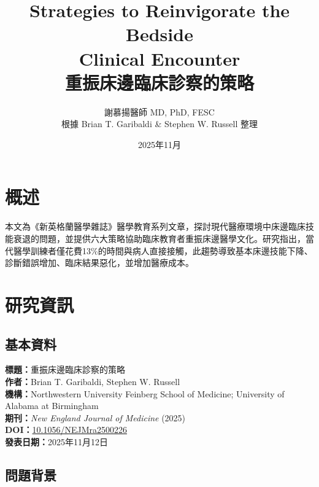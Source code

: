 \documentclass[11pt,a4paper]{article}
\title{\textbf{\Large Strategies to Reinvigorate the Bedside\\
Clinical Encounter\\
重振床邊臨床診察的策略}}
\author{謝慕揚醫師 MD, PhD, FESC\\
根據 Brian T. Garibaldi \& Stephen W. Russell 整理}
\date{2025年11月}
\begin{document}
\maketitle

\section{概述}

本文為《新英格蘭醫學雜誌》醫學教育系列文章，探討現代醫療環境中床邊臨床技能衰退的問題，並提供六大策略協助臨床教育者重振床邊醫學文化。研究指出，當代醫學訓練者僅花費13\%的時間與病人直接接觸，此趨勢導致基本床邊技能下降、診斷錯誤增加、臨床結果惡化，並增加醫療成本。

\section{研究資訊}

\subsection{基本資料}
\textbf{標題：}重振床邊臨床診察的策略\\
\textbf{作者：}Brian T. Garibaldi, Stephen W. Russell\\
\textbf{機構：}Northwestern University Feinberg School of Medicine; University of Alabama at Birmingham\\
\textbf{期刊：}\textit{New England Journal of Medicine} (2025)\\
\textbf{DOI：}\href{https://doi.org/10.1056/NEJMra2500226}{10.1056/NEJMra2500226}\\
\textbf{發表日期：}2025年11月12日

\subsection{問題背景}
\end{document}
